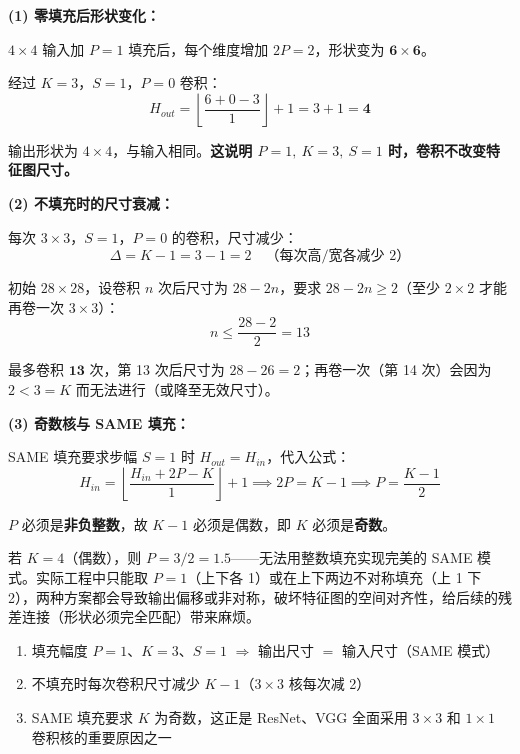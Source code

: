 \documentclass[a4paper,11pt]{ctexart}
\begin{document}
\begin{solutionbox}[参考答案与详细解析]
    \textbf{(1) 零填充后形状变化：}

    $4 \times 4$ 输入加 $P=1$ 填充后，每个维度增加 $2P=2$，形状变为 $\mathbf{6 \times 6}$。

    经过 $K=3$，$S=1$，$P=0$ 卷积：
    \begin{equation}
        H_{out} = \left\lfloor \frac{6 + 0 - 3}{1} \right\rfloor + 1 = 3 + 1 = \mathbf{4}
    \end{equation}

    输出形状为 $4 \times 4$，与输入相同。\textbf{这说明 $P=1,\ K=3,\ S=1$ 时，卷积不改变特征图尺寸。}

    \vspace{0.5em}
    \textbf{(2) 不填充时的尺寸衰减：}

    每次 $3 \times 3$，$S=1$，$P=0$ 的卷积，尺寸减少：
    \begin{equation}
        \Delta = K - 1 = 3 - 1 = 2 \quad \text{（每次高/宽各减少 2）}
    \end{equation}

    初始 $28 \times 28$，设卷积 $n$ 次后尺寸为 $28 - 2n$，要求 $28 - 2n \geq 2$（至少 $2 \times 2$ 才能再卷一次 $3 \times 3$）：
    \begin{equation}
        n \leq \frac{28 - 2}{2} = 13
    \end{equation}

    最多卷积 $\mathbf{13}$ 次，第 13 次后尺寸为 $28 - 26 = 2$；再卷一次（第 14 次）会因为 $2 < 3 = K$ 而无法进行（或降至无效尺寸）。

    \vspace{0.5em}
    \textbf{(3) 奇数核与 SAME 填充：}

    SAME 填充要求步幅 $S=1$ 时 $H_{out} = H_{in}$，代入公式：
    \begin{equation}
        H_{in} = \left\lfloor \frac{H_{in} + 2P - K}{1} \right\rfloor + 1
        \implies 2P = K - 1
        \implies P = \frac{K-1}{2}
    \end{equation}

    $P$ 必须是\textbf{非负整数}，故 $K-1$ 必须是偶数，即 $K$ 必须是\textbf{奇数}。

    若 $K=4$（偶数），则 $P = 3/2 = 1.5$——无法用整数填充实现完美的 SAME 模式。实际工程中只能取 $P=1$（上下各 1）或在上下两边不对称填充（上 1 下 2），两种方案都会导致输出偏移或非对称，破坏特征图的空间对齐性，给后续的残差连接（形状必须完全匹配）带来麻烦。

    \begin{keybox}[总结：填充三大结论]
        \begin{enumerate}
            \item 填充幅度 $P=1$、$K=3$、$S=1$ $\Rightarrow$ 输出尺寸 $=$ 输入尺寸（SAME 模式）
            \item 不填充时每次卷积尺寸减少 $K-1$（$3\times3$ 核每次减 2）
            \item SAME 填充要求 $K$ 为奇数，这正是 ResNet、VGG 全面采用 $3\times3$ 和 $1\times1$ 卷积核的重要原因之一
        \end{enumerate}
    \end{keybox}
\end{solutionbox}
\end{document}
